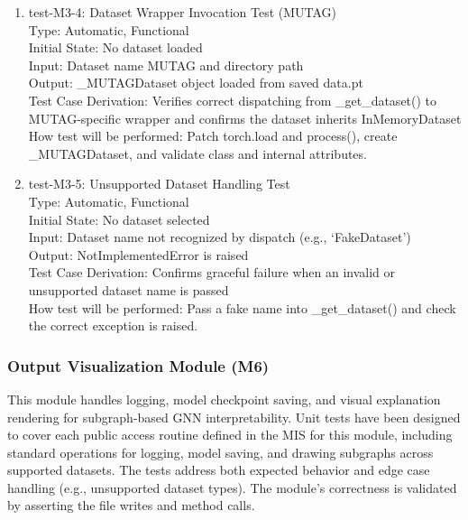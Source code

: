 \documentclass[12pt, titlepage]{article}
\begin{document}
\begin{enumerate}
\item{test-M3-4: Dataset Wrapper Invocation Test (MUTAG)\\}
Type: Automatic, Functional \\
Initial State: No dataset loaded \\
Input: Dataset name MUTAG and directory path \\
Output: \_MUTAGDataset object loaded from saved data.pt \\
Test Case Derivation: Verifies correct dispatching from \_get\_dataset() to MUTAG-specific wrapper and confirms the dataset inherits InMemoryDataset \\
How test will be performed: Patch torch.load and process(), create \_MUTAGDataset, and validate class and internal attributes.

\item{test-M3-5: Unsupported Dataset Handling Test\\}
Type: Automatic, Functional \\
Initial State: No dataset selected \\
Input: Dataset name not recognized by dispatch (e.g., `FakeDataset') \\
Output: NotImplementedError is raised \\
Test Case Derivation: Confirms graceful failure when an invalid or unsupported dataset name is passed \\
How test will be performed: Pass a fake name into \_get\_dataset() and check the correct exception is raised.


\end{enumerate}


\subsubsection{Output Visualization Module (M6)}

This module handles logging, model checkpoint saving, and visual explanation rendering for subgraph-based GNN interpretability. Unit tests have been designed to cover each public access routine defined in the MIS for this module, including standard operations for logging, model saving, and drawing subgraphs across supported datasets. The tests address both expected behavior and edge case handling (e.g., unsupported dataset types). The module’s correctness is validated by asserting the file writes and method calls.
\end{document}

